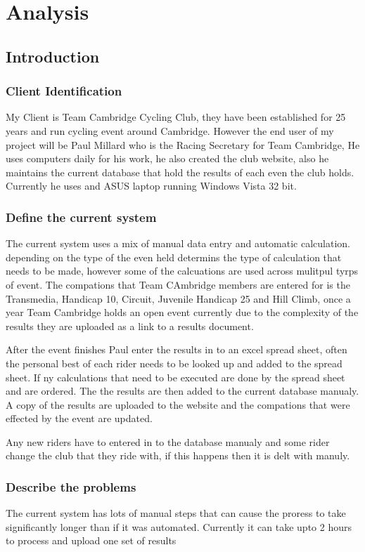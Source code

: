 \chapter{Analysis}

\section{Introduction}

\subsection{Client Identification}
My Client is Team Cambridge Cycling Club, they have been established for 25 years and run cycling event around Cambridge. However the end user of my project will be Paul Millard who is the Racing Secretary for Team Cambridge, He uses computers daily for his work, he also created the club website, also he maintains the current database that hold the results of each even the club holds. Currently he uses and ASUS laptop running Windows Vista 32 bit.
\subsection{Define the current system}
The current system uses a mix of manual data entry and automatic calculation. depending on the type of the even held determins the type of calculation that needs to be made, however some of the calcuations are used across mulitpul tyrps of event. The compations that Team CAmbridge members are entered for is the Transmedia, Handicap 10, Circuit, Juvenile Handicap 25 and Hill Climb, once a year Team Cambridge holds an open event currently due to the complexity of the results they are uploaded as a link to a  results document. 

After the event finishes Paul enter the results in to an excel spread sheet, often the personal best of each rider needs to be looked up and added to the spread sheet. If ny calculations that need to be executed are done by the spread sheet and are ordered. The the results are then added to the current database manualy. A copy of the results are uploaded to the website and the compations that were effected by the event are updated.

Any new riders have to entered in to the database manualy and some rider change the club that they ride with, if this happens then it is delt with manuly.
\subsection{Describe the problems}
The current system has lots of manual steps that can cause the proress to take significantly longer than if it was automated. Currently it can take upto 2 hours to process and upload one set of results

